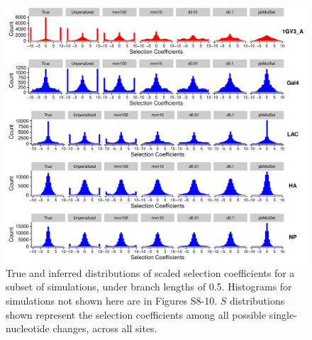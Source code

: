 \documentclass[11pt]{article}
\begin{document}
\vspace{3cm}
\begin{figure}[htbp]
  \centerline{\includegraphics[width=6in]{Figures/selcoeff_histograms_subset.pdf}}
  \caption{\label{fig:selcoeffs_histograms} True and inferred distributions of scaled selection coefficients for a subset of simulations, under branch lengths of 0.5. Histograms for simulations not shown here are in Figures S8-10. $S$ distributions shown represent the selection coefficients among all possible single-nucleotide changes, across all sites.}
\end{figure}
\end{document}
